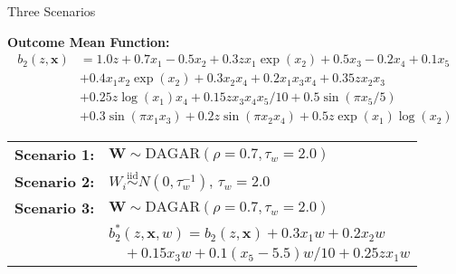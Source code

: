 \documentclass{beamer}
\begin{document}
\begin{frame}{Three Scenarios}

\textbf{Outcome Mean Function:}
\begin{align*}
b_2(z,\mathbf{x}) &= 1.0z + 0.7x_1 - 0.5x_2 + 0.3zx_1\exp(x_2) + 0.5x_3 - 0.2x_4 + 0.1x_5\\
&+ 0.4x_1x_2\exp(x_2) + 0.3x_2x_4 + 0.2x_1x_3x_4 + 0.35zx_2x_3\\
&+ 0.25z\log(x_1)x_4 + 0.15zx_3x_4x_5/10 + 0.5\sin(\pi x_5/5)\\
&+ 0.3\sin(\pi x_1x_3) + 0.2z\sin(\pi x_2x_4) + 0.5z\exp(x_1)\log(x_2)
\end{align*}
\pause
\vspace{0.5em}
\begin{tabular}{l l}
\textbf{Scenario 1:} & $\mathbf{W} \sim \text{DAGAR}(\rho = 0.7, \tau_w = 2.0)$ \\[0.3em]
\textbf{Scenario 2:} & $W_i \overset{\mathrm{iid}}{\sim} N(0, \tau_w^{-1})$, $\tau_w = 2.0$ \\[0.3em]
\textbf{Scenario 3:} & $\mathbf{W} \sim \text{DAGAR}(\rho = 0.7, \tau_w = 2.0)$ \\
& $b_2^*(z,\mathbf{x}, w) = b_2(z,\mathbf{x}) + 0.3x_1w + 0.2x_2w$ \\
& $\quad + 0.15x_3w + 0.1(x_5-5.5)w/10 + 0.25zx_1w$
\end{tabular}

\end{frame}
\end{document}
